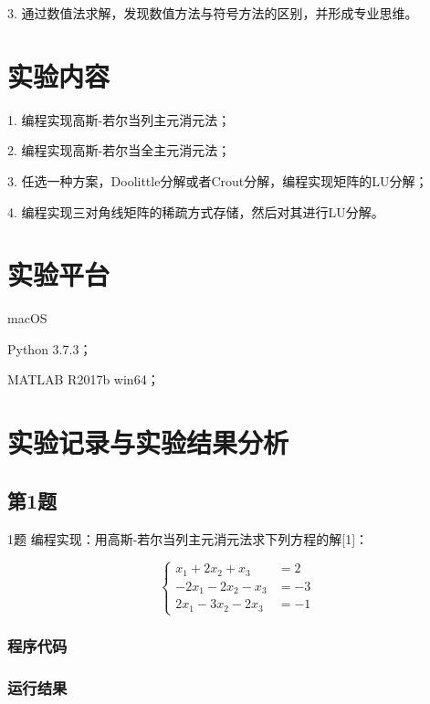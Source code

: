 3. 通过数值法求解，发现数值方法与符号方法的区别，并形成专业思维。

\section{实验内容}

1. 编程实现高斯-若尔当列主元消元法；

2. 编程实现高斯-若尔当全主元消元法；

3. 任选一种方案，Doolittle分解或者Crout分解，编程实现矩阵的LU分解；

4. 编程实现三对角线矩阵的稀疏方式存储，然后对其进行LU分解。

\section{实验平台}

macOS

Python 3.7.3；

MATLAB R2017b win64；

\section{实验记录与实验结果分析}

\subsection{第1题}

1题
编程实现：用高斯-若尔当列主元消元法求下列方程的解[1]：

\begin{equation}
    \left\{\begin{aligned}
        x_{1}+2 x_{2}+x_{3}     &=  2   \\
        -2 x_{1}-2 x_{2}-x_{3}  &=  -3  \\
        2 x_{1}-3 x_{2}-2 x_{3} &=  -1 
    \end{aligned}\right.
\end{equation}

\subsubsection{程序代码}



\subsubsection{运行结果}

